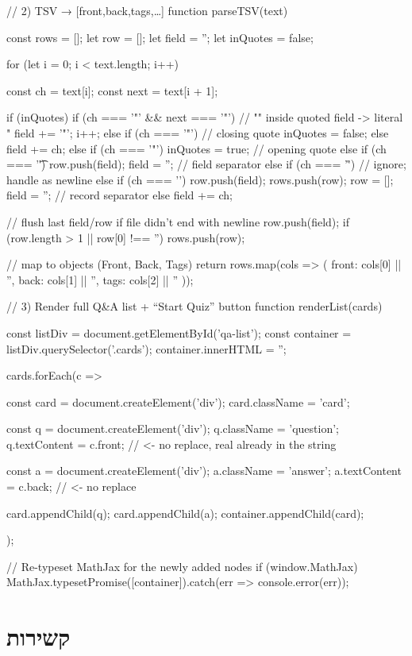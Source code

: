 \documentclass{tstextbook}
\begin{document}
    // 2) TSV → [{front,back,tags},…]
    function parseTSV(text) {
  const rows = [];
  let row = [];
  let field = '';
  let inQuotes = false;

  for (let i = 0; i < text.length; i++) {
    const ch = text[i];
    const next = text[i + 1];

    if (inQuotes) {
      if (ch === '"' && next === '"') {
        // "" inside quoted field -> literal "
        field += '"';
        i++;
      } else if (ch === '"') {
        // closing quote
        inQuotes = false;
      } else {
        field += ch;
      }
    } else {
      if (ch === '"') {
        inQuotes = true;                // opening quote
      } else if (ch === '\t') {
        row.push(field); field = '';    // field separator
      } else if (ch === '\r') {
        // ignore; handle \n as newline
      } else if (ch === '\n') {
        row.push(field); rows.push(row);
        row = []; field = '';           // record separator
      } else {
        field += ch;
      }
    }
  }
  // flush last field/row if file didn't end with newline
  row.push(field);
  if (row.length > 1 || row[0] !== '') rows.push(row);

  // map to objects (Front, Back, Tags)
  return rows.map(cols => ({
    front: cols[0] || '',
    back:  cols[1] || '',
    tags:  cols[2] || ''
  }));
}
// 3) Render full Q&A list + “Start Quiz” button
function renderList(cards) {
  const listDiv = document.getElementById('qa-list');
  const container = listDiv.querySelector('.cards');
  container.innerHTML = '';

  cards.forEach(c => {
    const card = document.createElement('div');
    card.className = 'card';

    const q = document.createElement('div');
    q.className = 'question';
    q.textContent = c.front;   // <- no replace, real \n already in the string

    const a = document.createElement('div');
    a.className = 'answer';
    a.textContent = c.back;    // <- no replace

    card.appendChild(q);
    card.appendChild(a);
    container.appendChild(card);
  });

  // Re-typeset MathJax for the newly added nodes
  if (window.MathJax) {
    MathJax.typesetPromise([container]).catch(err => console.error(err));
  }
}
  \chapter{קשירות}
\end{document}
